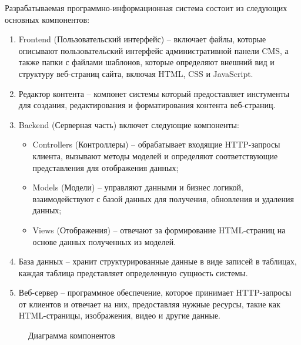 Разрабатываемая программно-информационная система состоит из следующих основных компонентов:
\begin{enumerate}
	\item Frontend (Пользовательский интерфейс) -- включает файлы, которые описывают пользовательский интерфейс административной панели CMS, а также папки с файлами шаблонов, которые определяют внешний вид и структуру веб-страниц сайта, включая HTML, CSS и JavaScript.
	\item Редактор контента -- компонет системы который предоставляет инстументы для создания, редактирования и форматирования контента веб-страниц.
	\item Backend (Серверная часть) включет следующие компоненты:
	\begin{itemize}
		\item Controllers (Контроллеры) -- обрабатывает входящие HTTP-запросы клиента, вызывают методы моделей и определяют соответствующие представления для отображения данных;
		\item Models (Модели) -- управляют данными и бизнес логикой, взаимодействуют с базой данных для получения, обновления и удаления данных;
		\item Views (Отображения) -- отвечают за формирование HTML-страниц на основе данных полученных из моделей.
	\end{itemize}
	\item База данных -- хранит структурированные данные в виде записей в таблицах, каждая таблица представляет определенную сущность системы.
	\item Веб-сервер -- программное обеспечение, которое принимает HTTP-запросы от клиентов и отвечает на них, предоставляя нужные ресурсы, такие как HTML-страницы, изображения, видео и другие данные.
\end{enumerate}

\begin{figure}[ht]
	\caption{Диаграмма компонентов}
	\label{comp:image}
\end{figure}

